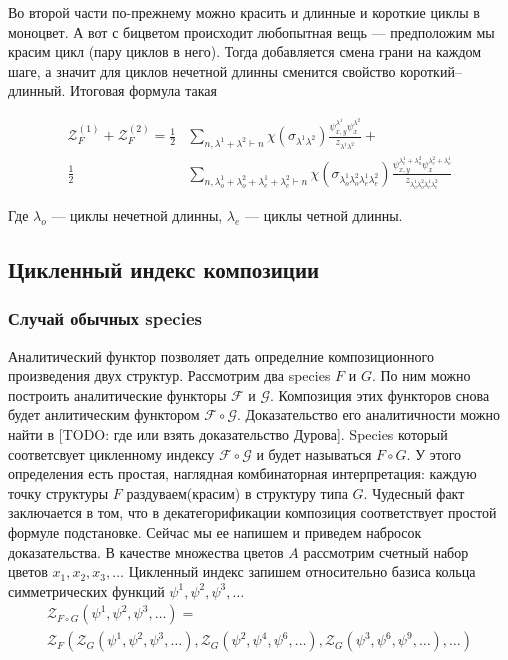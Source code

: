 Во второй части по-прежнему можно красить и длинные и короткие циклы в моноцвет.
А вот с бицветом происходит любопытная вещь --- предположим мы красим цикл (пару
циклов в него). Тогда добавляется смена грани на каждом шаге, а значит для
циклов нечетной длинны сменится свойство короткий--длинный. Итоговая формула
такая 

\begin{equation}
\label{eq:h-fr2}
\begin{split}
\mathcal Z_F^{(1)} + \mathcal Z_F^{(2)} = 
\frac{1}{2}&
\sum_{n, \lambda^1 + \lambda^2 \vdash n}\chi(\sigma_{\lambda^1 \lambda^2})
\frac{\psi_{x, y}^{\lambda^1} \psi_{x}^{\lambda^2}}{z_{\lambda^1 \lambda^2}}
+ \\
\frac{1}{2}&
\sum_{n, \lambda_o^1 + \lambda_o^2 + \lambda_e^1 + \lambda_e^2 \vdash
n}\chi(\sigma_{\lambda_o^1 \lambda_o^2 \lambda_e^1 \lambda_e^2})
\frac{\psi_{x, y}^{\lambda_e^1 + \lambda_o^2} \psi_{x}^{\lambda_e^2 + 
\lambda_o^1}}{z_{\lambda_o^1 \lambda_o^2 \lambda_e^1 \lambda_e^2}}
\end{split}
\end{equation}

Где $\lambda_o$ --- циклы нечетной длинны, $\lambda_e$ ---
циклы четной длинны.

\subsection{Цикленный индекс композиции}
\subsubsection{Случай обычных species}
Аналитический функтор позволяет дать определние композиционного произведения
двух структур. Рассмотрим два species $F$ и $G$. По ним можно построить
аналитические функторы $\mathcal F$ и $\mathcal G$. Композиция этих функторов
снова будет анлитическим функтором $\mathcal F \circ \mathcal G$. Доказательство
его аналитичности можно найти в [TODO: где или взять доказательство Дурова].
Species который соответсвует цикленному индексу $\mathcal F \circ \mathcal G$ и
будет называться $F \circ G$. У этого определения есть простая, наглядная
комбинаторная интерпретация: каждую точку структуры $F$ раздуваем(красим) в
структуру типа $G$. Чудесный факт заключается в том, что в декатегорификации
композиция соответствует простой формуле подстановке. Сейчас мы ее напишем и
приведем набросок доказательства. В качестве множества цветов $A$ рассмотрим
счетный набор цветов $x_1, x_2, x_3, \dots$ Цикленный индекс запишем
относительно базиса кольца симметрических функций $\psi^1, \psi^2, \psi^3, \dots$
\begin{multline}
\label{eq:zfg}
	\mathcal Z_{F \circ G} (\psi^1, \psi^2, \psi^3, \dots) = \\
	\mathcal Z_F(
		\mathcal Z_G(\psi^1, \psi^2, \psi^3, \dots),
		\mathcal Z_G(\psi^2, \psi^4, \psi^6, \dots),
		\mathcal Z_G(\psi^3, \psi^6, \psi^9, \dots),
		\dots
	)
\end{multline}

